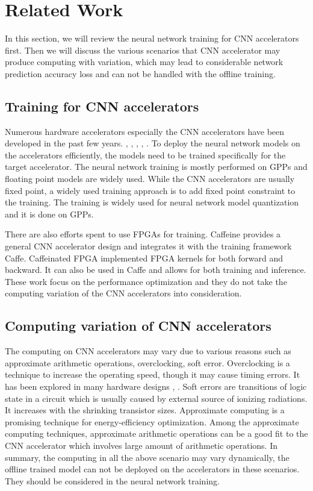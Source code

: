 \section{Related Work} \label{sec:relatedwork}
In this section, we will review the neural network training for CNN accelerators first.
Then we will discuss the various scenarios that CNN accelerator 
may produce computing with variation, which may lead to 
considerable network prediction accuracy loss and can not be handled 
with the offline training.

\subsection{Training for CNN accelerators} 
Numerous hardware accelerators especially the CNN accelerators have
been developed in the past few years. \cite{Cnvlutin_25} 
\cite{Caffeine_6,deepburing_12}, \cite{Aydonat_27}, 
\cite{Caffeine_6}, \cite{Caffeine_6,Aydonat_27}, \cite{Wei_29}. To 
deploy the neural network models on the accelerators efficiently, 
the models need to be trained specifically for the target accelerator. 
The neural network training is mostly performed on GPPs and
floating point models are widely used. While the CNN accelerators are usually fixed point, 
a widely used training approach is to add fixed point constraint to the training. 
The training is widely used for neural network model quantization and it is 
done on GPPs\cite{Hwang2014_17, Matthieu2014_8, Hwang2014_17}. 

There are also efforts spent to use FPGAs for training. 
Caffeine\cite{Caffeine_6} provides a general CNN accelerator design and integrates it with 
the training framework Caffe. Caffeinated FPGA\cite{DiCecco_4} implemented FPGA kernels 
for both forward and backward. It can also be used in Caffe and allows for 
both training and inference. These work focus on the performance optimization 
and they do not take the computing variation of the CNN accelerators into consideration.

\subsection{Computing variation of CNN accelerators} 
The computing on CNN accelerators may vary due to various reasons 
such as approximate arithmetic operations, overclocking, soft error.
Overclocking is a technique to increase the operating speed, though 
it may cause timing errors. It has been explored in many hardware 
designs \cite{overclock_3}, \cite{Razor}. 
Soft errors are transitions of logic state in a circuit 
which is usually caused by external source of ionizing radiations. 
It increases with the shrinking transistor sizes. 
Approximate computing is a promising technique for 
energy-efficiency optimization\cite{Miao_40,han_41}.
Among the approximate computing techniques, approximate 
arithmetic operations \cite{appro_45,approxANN_44} can be a good fit to the CNN accelerator 
which involves large amount of arithmetic operations. 
In summary, the computing in all the above scenario may vary dynamically, 
the offline trained model can not be deployed on the 
accelerators in these scenarios. They should be considered in the 
neural network training. 


